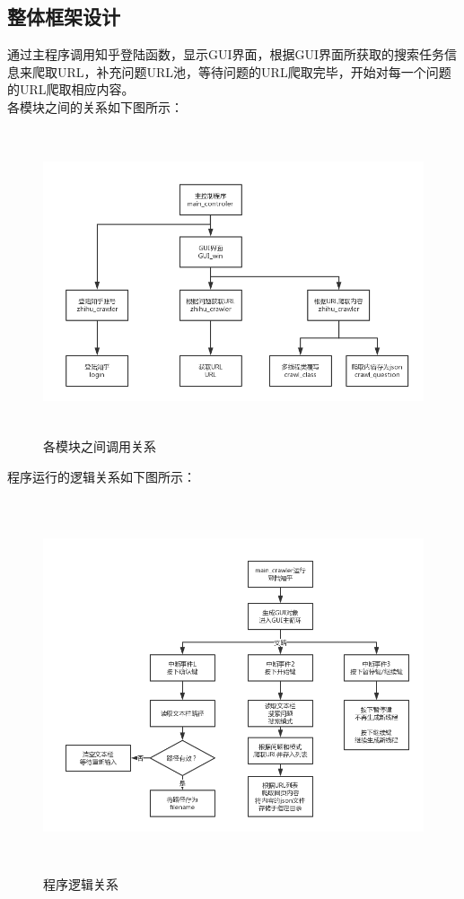 \documentclass[UTF-8,a4paper, 12pt]{article}
\numberwithin{equation}{section}
\begin{document}
\subsection{整体框架设计}
通过主程序调用知乎登陆函数，显示GUI界面，根据GUI界面所获取的搜索任务信息来爬取URL，补充问题URL池，等待问题的URL爬取完毕，开始对每一个问题的URL爬取相应内容。\\
各模块之间的关系如下图所示：
\begin{figure}[!htbp]
  \centering
  \includegraphics[width=15cm,height=9cm]{模块关系}
  \caption{各模块之间调用关系}\label{模块关系}
\end{figure}

程序运行的逻辑关系如下图所示：
\begin{figure}[!htbp]
  \centering
  \includegraphics[width=15cm,height=11cm]{主程序流程图}
  \caption{程序逻辑关系}\label{主程序流程图}
\end{figure}
\newpage
\end{document}
